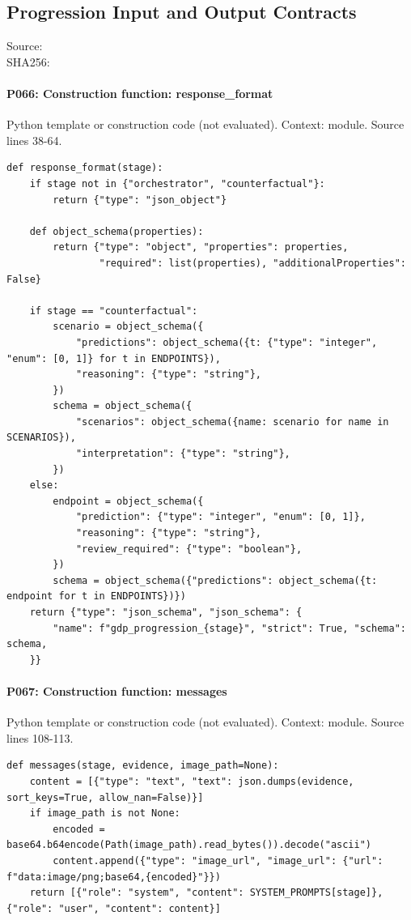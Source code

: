 \documentclass[10pt]{article}
\begin{document}
\subsection{Progression Input and Output Contracts}
Source: \\
SHA256: {\scriptsize{}}
\paragraph{P066: Construction function: response\_format}
Python template or construction code (not evaluated). Context: module. Source lines 38-64.
\begin{Verbatim}
def response_format(stage):
    if stage not in {"orchestrator", "counterfactual"}:
        return {"type": "json_object"}

    def object_schema(properties):
        return {"type": "object", "properties": properties,
                "required": list(properties), "additionalProperties": False}

    if stage == "counterfactual":
        scenario = object_schema({
            "predictions": object_schema({t: {"type": "integer", "enum": [0, 1]} for t in ENDPOINTS}),
            "reasoning": {"type": "string"},
        })
        schema = object_schema({
            "scenarios": object_schema({name: scenario for name in SCENARIOS}),
            "interpretation": {"type": "string"},
        })
    else:
        endpoint = object_schema({
            "prediction": {"type": "integer", "enum": [0, 1]},
            "reasoning": {"type": "string"},
            "review_required": {"type": "boolean"},
        })
        schema = object_schema({"predictions": object_schema({t: endpoint for t in ENDPOINTS})})
    return {"type": "json_schema", "json_schema": {
        "name": f"gdp_progression_{stage}", "strict": True, "schema": schema,
    }}
\end{Verbatim}
\paragraph{P067: Construction function: messages}
Python template or construction code (not evaluated). Context: module. Source lines 108-113.
\begin{Verbatim}
def messages(stage, evidence, image_path=None):
    content = [{"type": "text", "text": json.dumps(evidence, sort_keys=True, allow_nan=False)}]
    if image_path is not None:
        encoded = base64.b64encode(Path(image_path).read_bytes()).decode("ascii")
        content.append({"type": "image_url", "image_url": {"url": f"data:image/png;base64,{encoded}"}})
    return [{"role": "system", "content": SYSTEM_PROMPTS[stage]}, {"role": "user", "content": content}]
\end{Verbatim}
\end{document}
